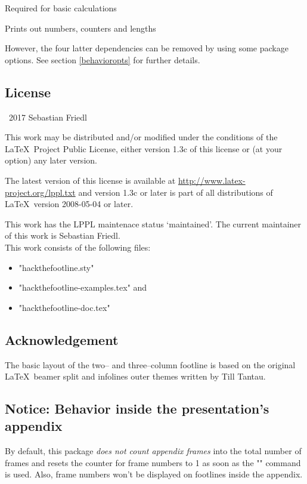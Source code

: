 \documentclass[11pt]{ltxdoc}
\begin{document}
	\medskip
	Required for basic calculations

	\medskip
	Prints out numbers, counters and lengths
	
	\bigskip
	However, the four latter dependencies can be removed by using some package options. See section \ref{behavioropts} for further details.
	
	
	\subsection*{License}
	\textcopyright\ 2017 Sebastian Friedl
	
	\smallskip
	This work may be distributed and/or modified under the conditions of the \LaTeX\ Project Public License, either version 1.3c of this license or (at your option) any later version.
	
	\smallskip
	The latest version of this license is available at \url{http://www.latex-project.org/lppl.txt} and version 1.3c or later is part of all distributions of \LaTeX\ version 2008-05-04 or later.
	
	\smallskip
	This work has the LPPL maintenace status \enquote*{maintained}. The current maintainer of this work is Sebastian Friedl. \\
	This work consists of the following files:
	\begin{itemize} \itemsep 0pt
		\item "hackthefootline.sty"
		\item "hackthefootline-examples.tex" and
		\item "hackthefootline-doc.tex"
	\end{itemize}
	
	
	\subsection*{Acknowledgement}
	The basic layout of the two-- and three--column footline is based on the original \LaTeX\ beamer split and infolines outer themes written by Till Tantau.
	
	
	\subsection*{Notice: Behavior inside the presentation's appendix}
	By default, this package \emph{does not count appendix frames} into the total number of frames and resets the counter for frame numbers to 1 as soon as the "\appendix" command is used. Also, frame numbers won't be displayed on footlines inside the appendix.
	
\end{document}

